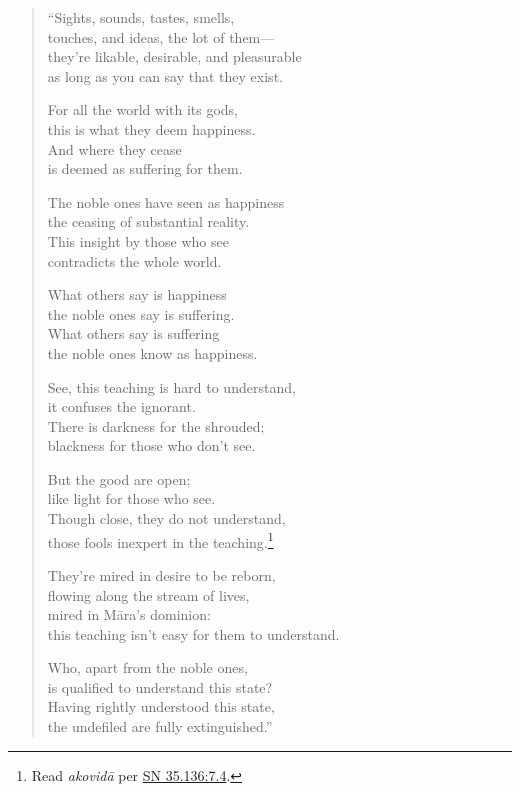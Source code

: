 \documentclass[12pt,openany]{book}%
\begin{document}
\begin{verse}%
“Sights, sounds, tastes, smells, \\
touches, and ideas, the lot of them—\\
they’re likable, desirable, and pleasurable \\
as long as you can say that they exist. 

For all the world with its gods, \\
this is what they deem happiness. \\
And where they cease \\
is deemed as suffering for them. 

The noble ones have seen as happiness \\
the ceasing of substantial reality. \\
This insight by those who see \\
contradicts the whole world. 

What others say is happiness \\
the noble ones say is suffering. \\
What others say is suffering \\
the noble ones know as happiness. 

See, this teaching is hard to understand, \\
it confuses the ignorant. \\
There is darkness for the shrouded; \\
blackness for those who don’t see. 

But the good are open; \\
like light for those who see. \\
Though close, they do not understand, \\
those fools inexpert in the teaching.\footnote{Read \textit{\textsanskrit{akovidā}} per \href{https://suttacentral.net/sn35.136/en/sujato\#7.4}{SN 35.136:7.4}. } 

They’re mired in desire to be reborn, \\
flowing along the stream of lives, \\
mired in \textsanskrit{Māra}’s dominion: \\
this teaching isn’t easy for them to understand. 

Who, apart from the noble ones, \\
is qualified to understand this state? \\
Having rightly understood this state, \\
the undefiled are fully extinguished.” 

%
\end{verse}
\end{document}
